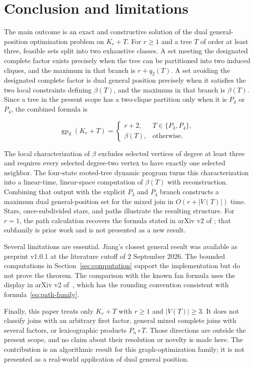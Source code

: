 \documentclass[preprint,12pt]{elsarticle}
\numberwithin{equation}{section}
\begin{document}
\section{Conclusion and limitations}\label{sec:conclusion}

The main outcome is an exact and constructive solution of the dual
general-position optimization problem on \(K_r+T\). For \(r\ge 1\) and a
tree \(T\) of order at least three, feasible sets split into two exhaustive
classes. A set meeting the designated complete factor exists precisely when
the tree can be partitioned into two induced cliques, and the maximum in that
branch is \(r+q_2(T)\). A set avoiding the designated complete factor is dual
general position precisely when it satisfies the two local constraints
defining \(\beta(T)\), and the maximum in that branch is \(\beta(T)\). Since
a tree in the present scope has a two-clique partition only when it is
\(P_3\) or \(P_4\), the combined formula is

\[
\operatorname{gp}_d(K_r+T)=
\begin{cases}
r+2,&T\in\{P_3,P_4\},\\
\beta(T),&\text{otherwise}.
\end{cases}
\]

The local characterization of \(\beta\) excludes selected vertices of degree
at least three and requires every selected degree-two vertex to have exactly
one selected neighbor. The four-state rooted-tree dynamic program turns this
characterization into a linear-time, linear-space computation of \(\beta(T)\)
with reconstruction. Combining that output with the explicit \(P_3\) and
\(P_4\) branch constructs a maximum dual general-position set for the mixed
join in \(O(r+|V(T)|)\) time. Stars, once-subdivided stars, and paths
illustrate the resulting structure. For \(r=1\), the path calculation
recovers the formula stated in arXiv v2 of
\cite{tian-et-al-removal}; that subfamily is prior work and is not presented as
a new result.

Several limitations are essential. Jiang's closest general result
\cite{jiang-complete-first-factor} was available as preprint v1.0.1 at the
literature cutoff of 2 September 2026. The bounded computations in
Section~\ref{sec:computation} support the implementation but do not prove the
theorem. The comparison with the known fan formula uses the display in arXiv
v2 of~\cite{tian-et-al-removal}, which has the rounding convention consistent
with formula~\eqref{eq:path-family}.

Finally, this paper treats only \(K_r+T\) with \(r\ge 1\) and
\(|V(T)|\ge 3\). It does not classify joins with an arbitrary first
factor, general mixed complete joins with several factors, or
lexicographic products \(P_n\circ T\). Those directions are outside the
present scope, and no claim about their resolution or novelty is made here.
The contribution is an algorithmic result for this graph-optimization family;
it is not presented as a real-world application of dual general position.
\end{document}
